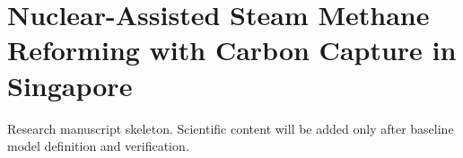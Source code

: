 \documentclass[11pt]{article}
\begin{document}
\section*{Nuclear-Assisted Steam Methane Reforming with Carbon Capture in Singapore}
Research manuscript skeleton. Scientific content will be added only after baseline model definition and verification.
\end{document}
